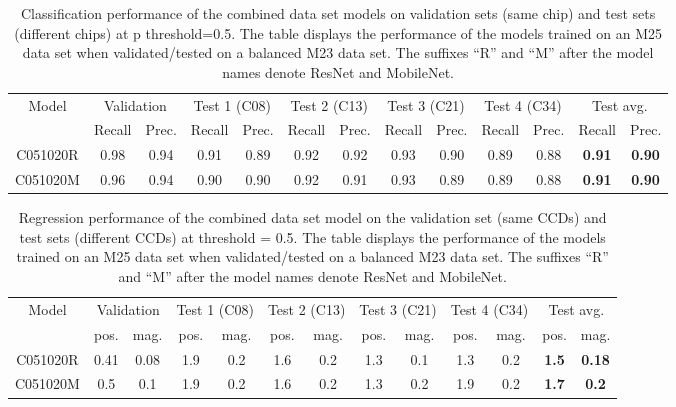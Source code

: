 \begin{table}
\label{tab:Multiple Chips}
  \caption{Classification performance of the combined data set models on validation sets (same chip) and test sets (different chips) at p threshold=0.5.
  The table displays the performance of the models trained on an M25 data set when validated/tested on a balanced M23 data set.
  The suffixes ``R'' and ``M'' after the model names denote ResNet and MobileNet.}
 \begin{tabular}{c|cc|cc|cc|cc|cc|cc}
 Model &  \multicolumn{2}{c|}{Validation} & \multicolumn{2}{c}{Test 1 (C08)}& \multicolumn{2}{c}{Test 2 (C13)}& \multicolumn{2}{c}{Test 3 (C21)}& \multicolumn{2}{c}{Test 4 (C34)}& \multicolumn{2}{c}{Test avg.}  \\
 & Recall & Prec. & Recall & Prec. & Recall & Prec. & Recall & Prec. & Recall & Prec.& Recall & Prec. \\
    C051020R & 0.98 & 0.94 & 0.91 & 0.89 & 0.92 & 0.92 & 0.93 & 0.90 & 0.89 & 0.88 & \textbf{0.91} & \textbf{0.90}\\
    C051020M & 0.96 & 0.94 & 0.90 & 0.90 & 0.92 & 0.91 & 0.93 & 0.89 & 0.89 & 0.88 & \textbf{0.91} & \textbf{0.90}
\end{tabular}
\end{table}

\begin{table}
  \caption{Regression performance of the combined data set model on the validation set (same CCDs) and test sets (different CCDs) at threshold = 0.5.
  The table displays the performance of the models trained on an M25 data set when validated/tested on a balanced M23 data set.
  The suffixes ``R'' and ``M'' after the model names denote ResNet and MobileNet.}
  \label{tab:Multiple Chips Regressor}
\begin{tabular}{c|cc|cc|cc|cc|cc|cc}
  Model &  \multicolumn{2}{c|}{Validation} & \multicolumn{2}{c}{Test 1 (C08)}& \multicolumn{2}{c}{Test 2 (C13)}& \multicolumn{2}{c}{Test 3 (C21)}& \multicolumn{2}{c}{Test 4 (C34)}& \multicolumn{2}{c}{Test avg.}\\ 
 & pos. & mag. & pos. & mag. & pos. & mag. & pos. & mag. & pos. & mag. & pos. & mag. \\
    C051020R & 0.41 & 0.08 & 1.9 & 0.2 & 1.6 & 0.2 & 1.3 & 0.1 & 1.3 & 0.2 & \textbf{1.5} & \textbf{0.18}\\
    C051020M & 0.5 & 0.1 & 1.9 & 0.2 & 1.6 & 0.2 & 1.3 & 0.2 & 1.9 & 0.2 & \textbf{1.7} & \textbf{0.2}
\end{tabular}
\end{table}

